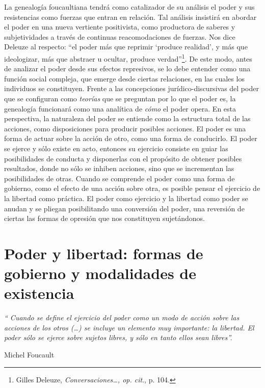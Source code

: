 La genealogía foucaultiana tendrá como catalizador de su análisis el poder y sus resistencias como fuerzas que entran en relación. Tal análisis insistirá en abordar el poder en una nueva vertiente positivista, como productora de saberes y subjetividades a través de continuas reacomodaciones de fuerzas. Nos dice Deleuze al respecto: \enquote{el poder más que reprimir \enquote{produce realidad}, y más que ideologizar, más que abstraer u ocultar, produce verdad}\footnote{Gilles Deleuze, \emph{Conversaciones\ldots, op. cit}., p. 104.}. De este modo, antes de analizar el poder desde sus efectos represivos, se lo debe entender como una función social compleja, que emerge desde ciertas relaciones, en las cuales los individuos se constituyen. Frente a las concepciones jurídico-discursivas del poder que se configuran como \emph{teorías} que se preguntan por lo que el poder es, la genealogía funcionará como una analítica de \emph{cómo} el poder opera. En esta perspectiva, la naturaleza del poder se entiende como la estructura total de las acciones, como disposiciones para producir posibles acciones. El poder es una forma de actuar sobre la acción de otro, como una forma de conducirlo. El poder se ejerce y sólo existe en acto, entonces su ejercicio consiste en guiar las posibilidades de conducta y disponerlas con el propósito de obtener posibles resultados, donde no sólo se inhiben acciones, sino que se incrementan las posibilidades de otras. Cuando se comprende el poder como una forma de gobierno, como el efecto de una acción sobre otra, es posible pensar el ejercicio de la libertad como práctica. El poder como ejercicio y la libertad como poder se anudan y se pliegan posibilitando una conversión del poder, una reversión de ciertas las formas de opresión que nos constituyen sujetándonos.

\section{Poder y libertad: formas de gobierno y modalidades de existencia}

\epigraph{\emph{\enquote{
Cuando se define el ejercicio del poder como un modo de acción sobre las acciones de los otros (\dots) se incluye un elemento muy importante: la libertad. El poder sólo se ejerce sobre sujetos libres, y sólo en tanto ellos sean libres}.}}{Michel Foucault}

